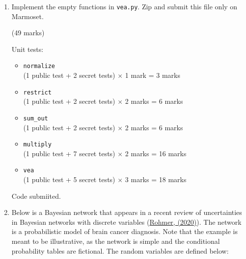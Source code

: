 \documentclass[12pt]{article}
\begin{document}
\begin{enumerate}[font=\Large,label=(\alph*)]

\item 
Implement the empty functions in \verb+vea.py+. Zip and submit this file only on Marmoset.
    
\begin{markscheme}
(49 marks)

Unit tests:
\begin{itemize}
    
    \item \verb+normalize+ \\
    (1 public test + 2 secret tests) $\times$ 1 mark = 3 marks

    \item \verb+restrict+ \\
    (1 public test + 2 secret tests) $\times$ 2 marks = 6 marks
    
    \item \verb+sum_out+ \\
    (1 public test + 2 secret tests) $\times$ 2 marks = 6 marks

    \item \verb+multiply+ \\
    (1 public test + 7 secret tests) $\times$ 2 marks = 16 marks
    
    \item \verb+vea+ \\
    (1 public test + 5 secret tests) $\times$ 3 marks = 18 marks

\end{itemize}
    
\end{markscheme}

\begin{sol}
    {\color{blue} 
    Code submiited.
    }
\end{sol}

\item
Below is a Bayesian network that appears in a recent review of uncertainties in Bayesian networks with discrete variables (\href{https://www.sciencedirect.com/science/article/abs/pii/S0952197619303045}{Rohmer, (2020)}). The network is a probabilistic model of brain cancer diagnosis. Note that the example is meant to be illustrative, as the network is simple and the conditional probability tables are fictional. The random variables are defined below: \\


\end{enumerate}
\end{document}

